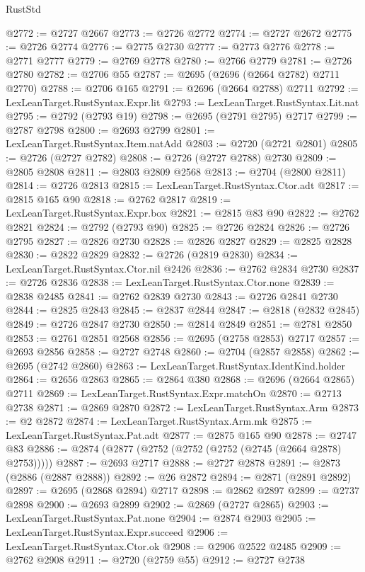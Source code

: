 \begin{lexlean}{RustStd}
\begin{coremodule}
@2772 := @2727 @2667
@2773 := @2726 @2772
@2774 := @2727 @2672
@2775 := @2726 @2774
@2776 := @2775 @2730
@2777 := @2773 @2776
@2778 := @2771 @2777
@2779 := @2769 @2778
@2780 := @2766 @2779
@2781 := @2726 @2780
@2782 := @2706 @55
@2787 := @2695 (@2696 (@2664 @2782) @2711 @2770)
@2788 := @2706 @165
@2791 := @2696 (@2664 @2788) @2711
@2792 := LexLeanTarget.RustSyntax.Expr.lit
@2793 := LexLeanTarget.RustSyntax.Lit.nat
@2795 := @2792 (@2793 @19)
@2798 := @2695 (@2791 @2795) @2717
@2799 := @2787 @2798
@2800 := @2693 @2799
@2801 := LexLeanTarget.RustSyntax.Item.natAdd
@2803 := @2720 (@2721 @2801)
@2805 := @2726 (@2727 @2782)
@2808 := @2726 (@2727 @2788) @2730
@2809 := @2805 @2808
@2811 := @2803 @2809 @2568
@2813 := @2704 (@2800 @2811)
@2814 := @2726 @2813
@2815 := LexLeanTarget.RustSyntax.Ctor.adt
@2817 := @2815 @165 @90
@2818 := @2762 @2817
@2819 := LexLeanTarget.RustSyntax.Expr.box
@2821 := @2815 @83 @90
@2822 := @2762 @2821
@2824 := @2792 (@2793 @90)
@2825 := @2726 @2824
@2826 := @2726 @2795
@2827 := @2826 @2730
@2828 := @2826 @2827
@2829 := @2825 @2828
@2830 := @2822 @2829
@2832 := @2726 (@2819 @2830)
@2834 := LexLeanTarget.RustSyntax.Ctor.nil @2426
@2836 := @2762 @2834 @2730
@2837 := @2726 @2836
@2838 := LexLeanTarget.RustSyntax.Ctor.none
@2839 := @2838 @2485
@2841 := @2762 @2839 @2730
@2843 := @2726 @2841 @2730
@2844 := @2825 @2843
@2845 := @2837 @2844
@2847 := @2818 (@2832 @2845)
@2849 := @2726 @2847 @2730
@2850 := @2814 @2849
@2851 := @2781 @2850
@2853 := @2761 @2851 @2568
@2856 := @2695 (@2758 @2853) @2717
@2857 := @2693 @2856
@2858 := @2727 @2748
@2860 := @2704 (@2857 @2858)
@2862 := @2695 (@2742 @2860)
@2863 := LexLeanTarget.RustSyntax.IdentKind.holder
@2864 := @2656 @2863
@2865 := @2864 @380
@2868 := @2696 (@2664 @2865) @2711
@2869 := LexLeanTarget.RustSyntax.Expr.matchOn
@2870 := @2713 @2738
@2871 := @2869 @2870
@2872 := LexLeanTarget.RustSyntax.Arm
@2873 := @2 @2872
@2874 := LexLeanTarget.RustSyntax.Arm.mk
@2875 := LexLeanTarget.RustSyntax.Pat.adt
@2877 := @2875 @165 @90
@2878 := @2747 @83
@2886 := @2874 (@2877 (@2752 (@2752 (@2752 (@2745 (@2664 @2878) @2753)))))
@2887 := @2693 @2717
@2888 := @2727 @2878
@2891 := @2873 (@2886 (@2887 @2888))
@2892 := @26 @2872
@2894 := @2871 (@2891 @2892)
@2897 := @2695 (@2868 @2894) @2717
@2898 := @2862 @2897
@2899 := @2737 @2898
@2900 := @2693 @2899
@2902 := @2869 (@2727 @2865)
@2903 := LexLeanTarget.RustSyntax.Pat.none
@2904 := @2874 @2903
@2905 := LexLeanTarget.RustSyntax.Expr.succeed
@2906 := LexLeanTarget.RustSyntax.Ctor.ok
@2908 := @2906 @2522 @2485
@2909 := @2762 @2908
@2911 := @2720 (@2759 @55)
@2912 := @2727 @2738

\end{coremodule}
\end{lexlean}
